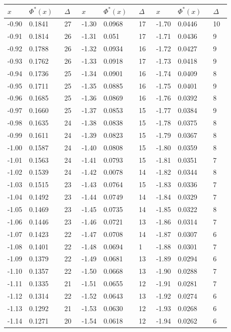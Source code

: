 \documentclass[russian, 12pt, fleqn]{article}
\begin{document}
\newpage
\noindent 
\begin{tabular}[b]{ | l | l |  l || l | l | l || l | l |  l |  }
\hline
$x\ \ \ \ \ $&$\Phi^*(x)\ \ \ $&$\Delta\ \ \ $&$x\ \ \ \ \ $&$\Phi^*(x)\ \ \ $&$\Delta\ \ \ $&$x\ \ \ \ \ $&$\Phi^*(x)\ \ \ $&$\Delta\ \ \ $\\
\hline
-0.90&0.1841&27&-1.30&0.0968&17&-1.70&0.0446&10\\%
-0.91&0.1814&26&-1.31&0.051  &17&-1.71&0.0436&9 \\%
-0.92&0.1788&26&-1.32&0.0934&16&-1.72&0.0427&9 \\%
-0.93&0.1762&26&-1.33&0.0918&17&-1.73&0.0418&9 \\%
-0.94&0.1736&25&-1.34&0.0901&16&-1.74&0.0409&8 \\%
-0.95&0.1711&25&-1.35&0.0885&16&-1.75&0.0401&9 \\%

-0.96&0.1685&25&-1.36&0.0869&16&-1.76&0.0392&8 \\%
-0.97&0.1660&25&-1.37&0.0853&15&-1.77&0.0384&9 \\%
-0.98&0.1635&24&-1.38&0.0838&15&-1.78&0.0375&8 \\%
-0.99&0.1611&24&-1.39&0.0823&15&-1.79&0.0367&8 \\%

-1.00&0.1587&24&-1.40&0.0808&15&-1.80&0.0359&8\\%
-1.01&0.1563&24&-1.41&0.0793&15&-1.81&0.0351&7\\%
-1.02&0.1539&24&-1.42&0.0078&14&-1.82&0.0344&8\\%
-1.03&0.1515&23&-1.43&0.0764&15&-1.83&0.0336&7\\%
-1.04&0.1492&23&-1.44&0.0749&14&-1.84&0.0329&7\\%

-1.05&0.1469&23&-1.45&0.0735&14&-1.85&0.0322&8\\%
-1.06&0.1446&23&-1.46&0.0721&13&-1.86&0.0314&7\\%
-1.07&0.1423&22&-1.47&0.0708&14&-1.87&0.0307&6\\%
-1.08&0.1401&22&-1.48&0.0694&1&-1.88&0.0301&7\\%
-1.09&0.1379&22&-1.49&0.0681&13&-1.89&0.0294&6\\%

-1.10&0.1357&22&-1.50&0.0668&13&-1.90&0.0288&7\\%
-1.11&0.1335&21&-1.51&0.0655&12&-1.91&0.0281&7\\%
-1.12&0.1314&22&-1.52&0.0643&13&-1.92&0.0274&6\\%
-1.13&0.1292&21&-1.53&0.0630&12&-1.93&0.0268&6\\%
-1.14&0.1271&20&-1.54&0.0618&12&-1.94&0.0262&6\\%


\end{tabular}
\end{document}
